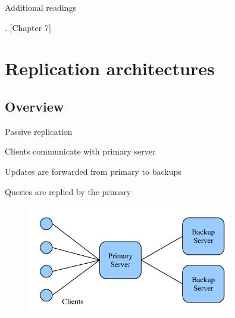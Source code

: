\begin{frame}{Additional readings}

\begin{Bib}
{\footnotesize
\BI
\item \alert{}
\item {}
\item {}. [Chapter 7]
\EI
}
\end{Bib}

\end{frame}



\section{Replication architectures}

\subsection{Overview}


\begin{frame}{Passive replication}
\BI
\item Clients communicate with primary server
\item Updates are forwarded from primary to backups
\item Queries are replied by the primary	
\EI

\begin{figure}
	\includegraphics[width=0.8\textwidth]{primarybackup}
\end{figure}

\end{frame}

